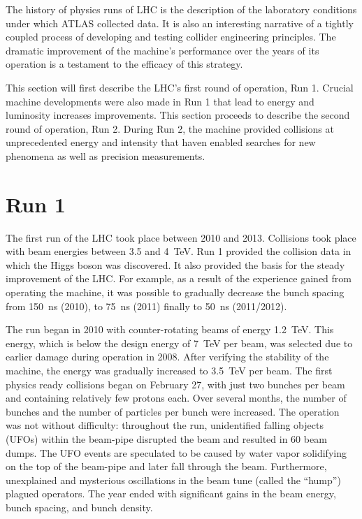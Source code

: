\label{sec:appendixLhc}

The history of physics runs of LHC is the description of the laboratory conditions under which ATLAS collected data.
It is also an interesting narrative of a tightly coupled process of developing and testing collider engineering principles.
The dramatic improvement of the machine's performance over the years of its operation is a testament to the efficacy of this strategy.

This section will first describe the LHC's first round of operation, Run 1.
Crucial machine developments were also made in Run 1 that lead to energy and luminosity increases improvements.
This section proceeds to describe the second round of operation, Run 2.
During Run 2, the machine provided collisions at unprecedented energy and intensity that haven enabled searches for new phenomena as well as precision measurements.

\section{Run 1}

The first run of the LHC took place between 2010 and 2013.
Collisions took place with beam energies between 3.5 and 4~TeV.\cite{lhcRun1}
Run 1 provided the collision data in which the Higgs boson was discovered. \cite{atlashiggs}
It also provided the basis for the steady improvement of the LHC.
For example, as a result of the experience gained from operating the machine, it was possible to gradually decrease the bunch spacing from 150~ns (2010), to 75~ns (2011) finally to 50~ns (2011/2012). \cite{lhcRun1}

The run began in 2010 with counter-rotating beams of energy 1.2~TeV.
This energy, which is below the design energy of 7~TeV per beam, was selected due to earlier damage during operation in 2008.
After verifying the stability of the machine, the energy was gradually increased to 3.5~TeV per beam.
The first physics ready collisions began on February 27, with just two bunches per beam and containing relatively few protons each.
Over several months, the number of bunches and the number of particles per bunch were increased.
The operation was not without difficulty: throughout the run, unidentified falling objects (UFOs) within the beam-pipe disrupted the beam and resulted in 60 beam dumps.
The UFO events are speculated to be caused by water vapor solidifying on the top of the beam-pipe and later fall through the beam.
Furthermore, unexplained and mysterious oscillations in the beam tune (called the ``hump'') plagued operators. \cite{lhcRun1}
The year ended with significant gains in the beam energy, bunch spacing, and bunch density.

